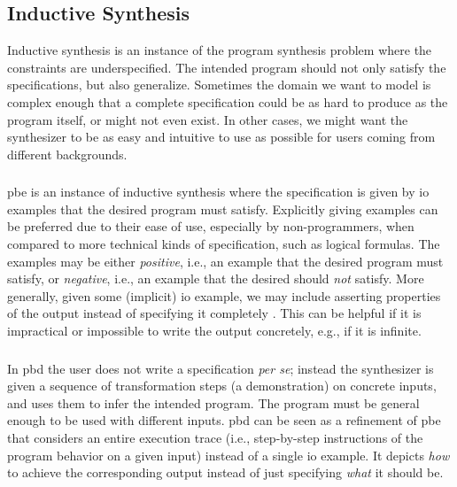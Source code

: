 \subsection{Inductive Synthesis}
\label{sec:inductive}

Inductive synthesis is an instance of the program synthesis problem where the
constraints are underspecified.
The intended program should not only satisfy the specifications, but also
generalize.
Sometimes the domain we want to model is complex enough that a complete
specification could be as hard to produce as the program itself, or might not
even exist.
In other cases, we might want the synthesizer to be as easy and intuitive to use
as possible for users coming from different backgrounds.

\subsubsection{}

\gls{pbe} is an instance of inductive synthesis where the specification is given
by \gls{io} examples that the desired program must satisfy.
Explicitly giving examples can be preferred due to their ease of use, especially
by non-programmers, when compared to more technical kinds of specification, such
as logical formulas.
The examples may be either \textit{positive}, i.e., an example that the desired
program must satisfy, or \textit{negative}, i.e., an example that the desired
should \textit{not} satisfy.
More generally, given some (implicit) \gls{io} example, we may include asserting
properties of the output instead of specifying it completely
\cite{Polozov:2015:FFI}.
This can be helpful if it is impractical or impossible
to write the output concretely, e.g., if it is infinite.

\subsubsection{}

In \gls{pbd} the user does not write a specification \textit{per se};
instead the synthesizer is given a sequence of transformation steps (a
demonstration) on concrete inputs, and uses them to infer the intended program.
The program must be general enough to be used with different inputs.
\gls{pbd} can be seen as a refinement of \gls{pbe} that
considers an entire execution trace (i.e., step-by-step instructions of the
program behavior on a given input) instead of a single \gls{io} example.
It depicts \textit{how} to achieve the corresponding output instead of just
specifying \textit{what} it should be.


